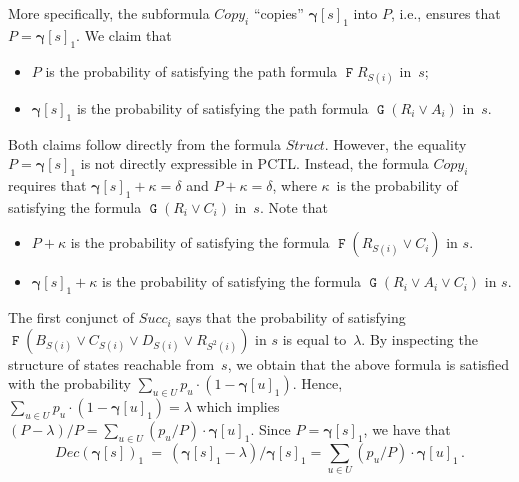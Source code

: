 \documentclass[a4paper,UKenglish,cleveref, autoref, thm-restate]{lipics-v2021}
\newcommand{\Succ}{\mathit{Succ}}
\newcommand{\DEC}{\mathit{Dec}}
\renewcommand{\vec}[1]{\pmb{#1}}
\newcommand{\Struct}{\textit{Struct}}
\newcommand{\Copy}{\textit{Copy}}
\newcommand{\cv}{\vec{\gamma}}
\newcommand*{\opf}{\operatorname{\pmb{\mathtt{F}}}}
\newcommand*{\opg}{\operatorname{\pmb{\mathtt{G}}}}
\begin{document}
More specifically, the subformula $\Copy_i$ ``copies'' $\cv[s]_1$ into $P$, i.e., ensures that $P = \cv[s]_1$. We claim that 
\begin{itemize}
    \item $P$ is the probability of satisfying the path formula $\opf R_{S(i)}$ in~$s$;
    \item $\cv[s]_1$ is the probability of satisfying the path formula $\opg(R_i {\vee} A_i)$ in~$s$.
\end{itemize}
Both claims follow directly from the formula $\Struct$. However, the equality $P = \cv[s]_1$ is not directly expressible in PCTL. Instead, the formula $\Copy_i$ requires that $\cv[s]_1 + \kappa = \delta$ and $P + \kappa = \delta$, where $\kappa$~is the probability of satisfying the formula $\opg(R_i {\vee} C_i)$ in~$s$. 
Note that
\begin{itemize}
    \item $P + \kappa$ is the probability of satisfying the formula $\opf(R_{S(i)} {\vee} C_i)$ in $s$.
    \item $\cv[s]_1 + \kappa$ is the probability of satisfying the formula $\opg(R_i {\vee} A_i {\vee} C_i)$ in $s$. \end{itemize}


The first conjunct of $\Succ_i$ says that the probability of satisfying $\opf(B_{S(i)} {\vee} C_{S(i)} {\vee} D_{S(i)} {\vee} R_{S^2(i)})$ in $s$ is equal to~$\lambda$. By inspecting the structure of states reachable from~$s$, we obtain that the above formula is satisfied with the probability $\sum_{u \in U} p_u \cdot (1{-}\cv[u]_1)$. Hence, $\sum_{u \in U} p_u \cdot (1{-}\cv[u]_1) = \lambda$ which implies $(P{-}\lambda)/P = \sum_{u \in U}(p_u/P) \cdot \cv[u]_1$. Since $P = \cv[s]_1$, we have that 
\[
  \DEC(\cv[s])_1 \ = \ (\cv[s]_1 {-} \lambda)/\cv[s]_1 = \sum_{u \in U} (p_u/P) \cdot \cv[u]_1\,.
\]   
\end{document}

